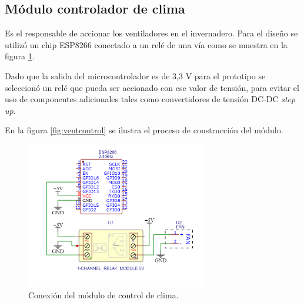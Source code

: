 \subsection{Módulo controlador de clima}
\label{Módulo controlador de clima}

Es el responsable de accionar los ventiladores en el invernadero. Para el diseño se utilizó un chip ESP8266 conectado a un relé de una vía como se muestra en la figura \ref{fig:ventschem}. 

Dado que la salida del microcontrolador es de 3,3 V para el prototipo se seleccionó un relé que pueda ser accionado con ese valor de tensión, para evitar el uso de componentes adicionales tales como convertidores de tensión DC-DC \textit{step up}. 

En la figura \ref{fig:ventcontrol} se ilustra el proceso de construcción del módulo. 



\begin{figure}[!h]
	\centering
	\includegraphics[width=0.7\textwidth]{./Figures/vent_schem.png}
	\caption[Conexión del módulo de control de clima]{Conexión del módulo de control de clima.}
	\label{fig:ventschem}
\end{figure}


